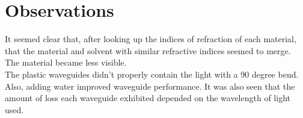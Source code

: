 \documentclass{article}
\begin{document}
\section{Observations}

It seemed clear that, after looking up the indices of refraction of each material, that the material and solvent with similar refractive indices seemed to merge. The material became less visible.\\
The plastic waveguides didn't properly contain the light with a 90 degree bend. Also, adding water improved waveguide performance. It was also seen that the amount of loss each waveguide exhibited depended on the wavelength of light used.
\end{document}

